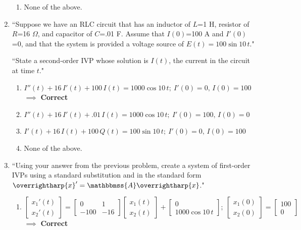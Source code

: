 \documentclass[11pt]{article}
\begin{document}
\begin{enumerate}
\begin{enumerate}
					\item None of the above.
				\end{enumerate}
				
		\item ``Suppose we have an RLC circuit that has an inductor of $L$=1 H, resistor of $R$=16 $\Omega$, and capacitor of $C$=.01 F. Assume that $I(0)$=100 A and $I'(0)$=0, and that the system is provided a voltage source of $E(t)=100\sin{10\, t}$."
		
		``State a second-order IVP whose solution is $I(t)$, the current in the circuit at time $t$."
			\begin{enumerate}
				\item \(I''(t)+16\,I'(t)+100\,I(t)=1000\cos{10\, t};\ I'(0)=0,\, I(0)=100\) $\implies$ \textbf{Correct}
				
				\item \(I''(t)+16\,I'(t)+.01\,I(t)=1000\cos{10\, t};\ I'(0)=100,\, I(0)=0\)
				
				\item \(I'(t)+16\,I(t)+100\,Q(t)=100\sin{10\,t};\ I'(0)=0,\, I(0)=100\)
				
				\item None of the above.
			\end{enumerate}
		
		\item ``Using your answer from the previous problem, create a system of first-order IVPs using a standard substitution and in the standard form \(\overrightharp{x}'=\mathbbmss{A}\overrightharp{x}\)."
		
			\begin{enumerate}
				\item \(\begin{bmatrix} x_{1}'(t) \\ x_{2}'(t) \end{bmatrix}=\begin{bmatrix} 0 & 1 \\ -100 & -16 \end{bmatrix}\begin{bmatrix} x_{1}(t) \\ x_{2}(t) \end{bmatrix}+\begin{bmatrix} 0 \\ 1000\cos{10\,t} \end{bmatrix};\ \begin{bmatrix} x_{1}(0) \\ x_{2}(0) \end{bmatrix}=\begin{bmatrix} 100 \\ 0 \end{bmatrix}\)
 $\implies$ \textbf{Correct}
				

\end{enumerate}
\end{enumerate}
\end{document}
